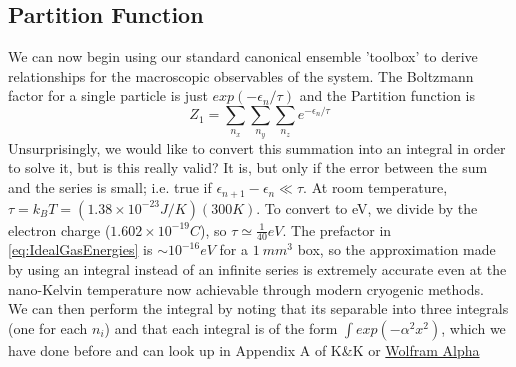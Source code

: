 \subsection{Partition Function}
We can now begin using our standard canonical ensemble 'toolbox' to derive relationships for the macroscopic observables of the system. The Boltzmann factor for a single particle is just $exp(-\epsilon_n/\tau)$ and the Partition function is
\begin{equation}
Z_1 = \sum_{n_x} \sum_{n_y} \sum_{n_z} e^{-\epsilon_n/\tau}
\end{equation}
Unsurprisingly, we would like to convert this summation into an integral in order to solve it, but is this really valid? It is, but only if the error between the sum and the series is small; i.e. true if $\epsilon_{n+1} - \epsilon_n \ll \tau$. 
At room temperature, $\tau = k_B T = (1.38 \times 10^{-23} J/K)(300 K)$. 
To convert to eV, we divide by the electron charge ($1.602 \times 10^{-19} C$), 
so $\tau \simeq \frac{1}{40} eV$. The
prefactor in \cref{eq:IdealGasEnergies} is $\sim 10^{-16} eV$ for a $1~mm^3$ box,
so the approximation made by using an integral instead of an infinite series is extremely accurate even at the nano-Kelvin temperature now achievable through modern cryogenic methods.\\

We can then perform the integral by noting that its separable into three integrals (one for each $n_i$) and that each integral is of the form $\int exp(-\alpha^2 x^2)$, which we have done before and can look up in Appendix A of K\&K or 
\href{http://www.wolframalpha.com/input/?i=integrate\%20exp(-a\%5E2\%20x\%5E2)\%20from\%20x\%3D0..infinity}{Wolfram Alpha}



